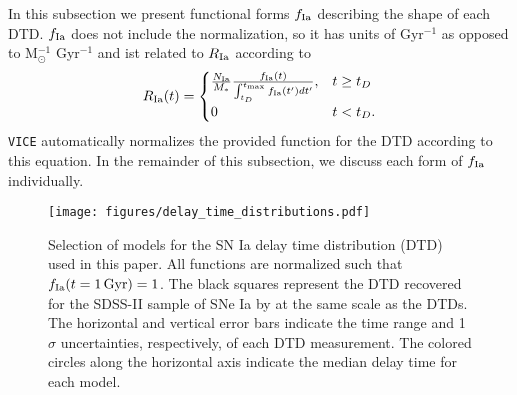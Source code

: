 \documentclass[twocolumn,twocolappendix,linenumbers,trackchanges]{aastex631}
\newcommand{\vice}{{\tt VICE}\xspace}
\begin{document}
In this subsection we present functional forms $f_{\rm Ia}$ describing the shape of each DTD. $f_{\rm Ia}$ does not include the normalization, so it has units of Gyr$^{-1}$ as opposed to M$_\odot^{-1}$ Gyr$^{-1}$ and ist related to $R_{\rm Ia}$ according to
\begin{equation}
    R_{\rm Ia}(t) = 
    \begin{cases}
        \frac{N_{\rm Ia}}{M_*}
        \frac{f_{\rm Ia}(t)}{\int_{t_D}^{t_{\rm max}} f_{\rm Ia}(t') dt'}, & t \ge t_D \\
        0 & t < t_D.
    \end{cases}
    \label{eq:dtd-function}
\end{equation}
\vice automatically normalizes the provided function for the DTD according to this equation.
In the remainder of this subsection, we discuss each form of $f_{\rm Ia}$ individually.

\begin{figure}
    \centering
    \texttt{[image: figures/delay\_time\_distributions.pdf]}
    \caption{Selection of models for the SN Ia delay time distribution (DTD) used in this paper. All functions are normalized such that $f_{\rm Ia}(t=1\,{\rm Gyr})=1$. The black squares represent the DTD recovered for the SDSS-II sample of SNe Ia by \citet{Maoz2012-SloanIIDTD} at the same scale as the DTDs. The horizontal and vertical error bars indicate the time range and 1$\sigma$ uncertainties, respectively, of each DTD measurement. The colored circles along the horizontal axis indicate the median delay time for each model.}
    \label{fig:dtds}
\end{figure}
\end{document}
